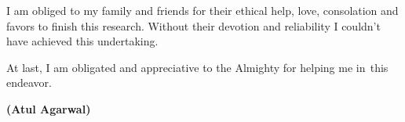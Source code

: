 \par I am obliged to my family and friends for their ethical help, love, consolation and favors to finish this research. Without their devotion and reliability I couldn't have achieved this undertaking.\\


\par At last, I am obligated and appreciative to the Almighty for helping me in\textcolor{white}{e}this endeavor.

\vspace{1.2cm}
\begin{flushright}
	\textbf{(Atul Agarwal)}
\end{flushright}


